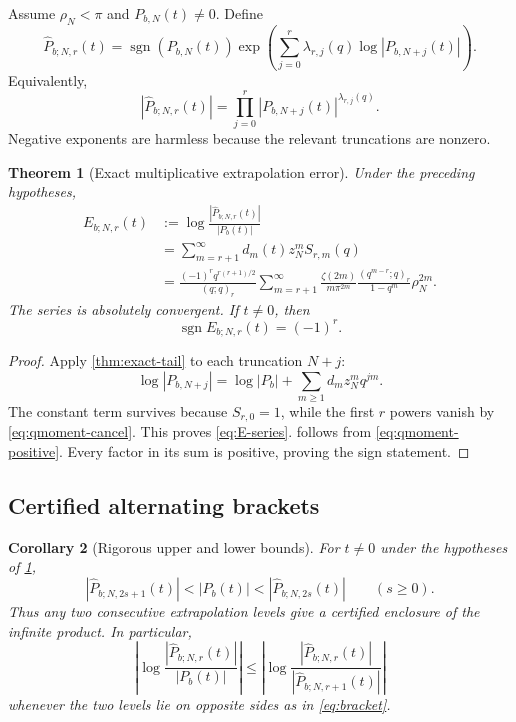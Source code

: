 \documentclass[11pt]{article}
\newtheorem{theorem}{Theorem}[section]
\newtheorem{corollary}[theorem]{Corollary}
\theoremstyle{definition}
\theoremstyle{remark}
\newcommand{\sgn}{\operatorname{sgn}}
\begin{document}
Assume $\rho_N<\pi$ and $P_{b,N}(t)\ne0$. Define
\begin{equation}
\widehat P_{b;N,r}(t)
=\sgn(P_{b,N}(t))
\exp\!\left(\sum_{j=0}^{r}\lambda_{r,j}(q)
\log|P_{b,N+j}(t)|\right).
\label{eq:Phat}
\end{equation}
Equivalently,
\begin{equation}
|\widehat P_{b;N,r}(t)|
=\prod_{j=0}^{r}|P_{b,N+j}(t)|^{\lambda_{r,j}(q)}.
\label{eq:Phat-product}
\end{equation}
Negative exponents are harmless because the relevant truncations are nonzero.

\begin{theorem}[Exact multiplicative extrapolation error]
\label{thm:exact-rich-error}
Under the preceding hypotheses,
\begin{align}
E_{b;N,r}(t)
&:=\log\frac{|\widehat P_{b;N,r}(t)|}{|P_b(t)|}
\label{eq:E-def}\\
&=\sum_{m=r+1}^{\infty}d_m(t)z_N^mS_{r,m}(q)
\label{eq:E-series}\\
&=\frac{(-1)^rq^{r(r+1)/2}}{(q;q)_r}
\sum_{m=r+1}^{\infty}
\frac{\zeta(2m)}{m\pi^{2m}}
\frac{(q^{m-r};q)_r}{1-q^m}\rho_N^{2m}.
\label{eq:E-explicit}
\end{align}
The series is absolutely convergent. If $t\ne0$, then
\begin{equation}
\sgn E_{b;N,r}(t)=(-1)^r.
\label{eq:E-sign}
\end{equation}
\end{theorem}

\begin{proof}
Apply \cref{thm:exact-tail} to each truncation $N+j$:
\[
\log|P_{b,N+j}|=\log|P_b|+
\sum_{m\ge1}d_m z_N^m q^{jm}.
\]
The constant term survives because $S_{r,0}=1$, while the first $r$ powers vanish by \cref{eq:qmoment-cancel}. This proves \cref{eq:E-series}.  follows from \cref{eq:qmoment-positive}. Every factor in its sum is positive, proving the sign statement.
\end{proof}

\subsection{Certified alternating brackets}

\begin{corollary}[Rigorous upper and lower bounds]
\label{cor:brackets}
For $t\ne0$ under the hypotheses of \cref{thm:exact-rich-error},
\begin{equation}
|\widehat P_{b;N,2s+1}(t)|<|P_b(t)|<
|\widehat P_{b;N,2s}(t)|
\qquad(s\ge0).
\label{eq:bracket}
\end{equation}
Thus any two consecutive extrapolation levels give a certified enclosure of the infinite product. In particular,
\begin{equation}
\left|\log\frac{|\widehat P_{b;N,r}(t)|}{|P_b(t)|}\right|
\le
\left|\log\frac{|\widehat P_{b;N,r}(t)|}
{|\widehat P_{b;N,r+1}(t)|}\right|
\label{eq:aposteriori-log}
\end{equation}
whenever the two levels lie on opposite sides as in \cref{eq:bracket}.
\end{corollary}
\end{document}

